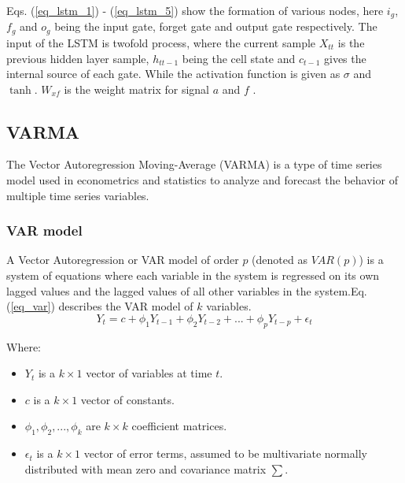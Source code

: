 \documentclass[conference]{IEEEtran}
\begin{document}
Eqs. (\ref{eq_lstm_1}) - (\ref{eq_lstm_5}) show the formation of various nodes, here \(i_g\), \(f_g\) and \(o_g\) being the input gate, forget gate and output gate respectively. The input of the LSTM is twofold process, where the current sample  \(X_{tt}\) is the previous hidden layer sample,  \(h_{tt-1}\) being the cell state and  \(c_{t-1}\) gives the internal source of each gate. While the activation function is given as \(\sigma\) and \(\tanh\).  \(W_{xf}\) is the weight matrix for signal \(a\) and  \(f\) \cite{b11}.

\subsection{VARMA}
The Vector Autoregression Moving-Average (VARMA) is a type of time series model used in econometrics and statistics to analyze and forecast the behavior of multiple time series variables.
\subsubsection{VAR model}\hfill\par
A Vector Autoregression or VAR model of order \(p\) (denoted as \(VAR(p)\)) is a system of equations where each variable in the system is regressed on its own lagged values and the lagged values of all other variables in the system.Eq. (\ref{eq_var}) describes the VAR model of \(k\) variables.
\begin{equation}\label{eq_var}
    Y_t = c + \phi_1Y_{t - 1} + \phi_2Y_{t - 2} + ... + \phi_pY_{t - p} + \epsilon_t
\end{equation}\par
Where:\par
\begin{itemize}
    \item \(Y_t\) is a \(k \times 1\) vector of variables at time \(t\).
    \item \(c\) is a \(k \times 1\) vector of constants.
    \item \(\phi_1, \phi_2, ..., \phi_k\) are \(k \times k\) coefficient matrices.
    \item \(\epsilon_t\) is a \(k \times 1\) vector of error terms, assumed to be multivariate normally distributed with mean zero and covariance matrix \(\sum\).
\end{itemize}
\end{document}
